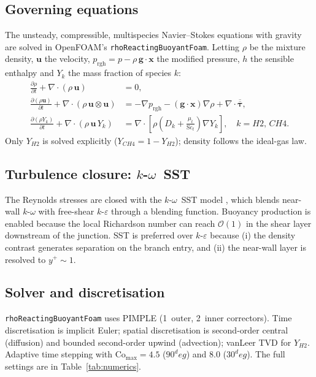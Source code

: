 \documentclass[10pt,a4paper]{article}
\def\Hi{H2}%
\def\CHi{CH4}%
\def\circ{ deg}%
\newcommand{\Hi}{\ensuremath{\mathrm{H_2}}}
\newcommand{\CHi}{\ensuremath{\mathrm{CH_4}}}
\begin{document}
\subsection{Governing equations}
\label{sec:method_govern}
The unsteady, compressible, multispecies Navier--Stokes equations
with gravity are solved in OpenFOAM's \texttt{rhoReactingBuoyantFoam}.
Letting \(\rho\) be the mixture density, \(\mathbf{u}\) the velocity,
\(p_{\mathrm{rgh}} = p - \rho\,\mathbf{g}\!\cdot\!\mathbf{x}\) the
modified pressure, \(h\) the sensible enthalpy and \(Y_k\) the mass
fraction of species \(k\):
\begin{align}
\frac{\partial\rho}{\partial t} +
\nabla\!\cdot\!(\rho\,\mathbf{u}) &= 0,
\label{eq:cont}\\[2pt]
\frac{\partial(\rho\mathbf{u})}{\partial t} +
\nabla\!\cdot\!(\rho\,\mathbf{u}\!\otimes\!\mathbf{u})
&= -\nabla p_{\mathrm{rgh}}
- (\mathbf{g}\!\cdot\!\mathbf{x})\nabla\rho
+\nabla\!\cdot\!\overline{\overline{\boldsymbol{\tau}}},
\label{eq:mom}\\[2pt]
\frac{\partial(\rho Y_k)}{\partial t} +
\nabla\!\cdot\!(\rho\,\mathbf{u}\,Y_k)
&=\nabla\!\cdot\!\left[\rho\!\left(D_k+\frac{\mu_t}{\mathrm{Sc}_t}\right)
\nabla Y_k\right],\quad k = \Hi,\,\CHi.
\label{eq:species}
\end{align}
Only \(Y_{\Hi}\) is solved explicitly (\(Y_{\CHi}=1-Y_{\Hi}\));
density follows the ideal-gas law.

\subsection{Turbulence closure: \texorpdfstring{$k$-$\omega$~SST}{k-omega SST}}
\label{sec:method_turb}
The Reynolds stresses are closed with the \(k\)-\(\omega\)~SST model
\citep{menter1994sst}, which blends near-wall \(k\)-\(\omega\) with
free-shear \(k\)-\(\varepsilon\) through a blending function.
Buoyancy production is enabled because the local Richardson number
can reach \(\mathcal{O}(1)\) in the shear layer downstream of the
junction.  SST is preferred over \(k\)-\(\varepsilon\)
\citep{su2022prediction} because (i) the density contrast generates
separation on the branch entry, and (ii) the near-wall layer is
resolved to \(y^+\sim 1\).

\subsection{Solver and discretisation}
\label{sec:method_solver}
\texttt{rhoReactingBuoyantFoam} uses PIMPLE (1~outer, 2~inner
correctors).  Time discretisation is implicit Euler; spatial
discretisation is second-order central (diffusion) and bounded
second-order upwind (advection); vanLeer TVD for \(Y_{\Hi}\).
Adaptive time stepping with \(\mathrm{Co}_{\max}=4.5\) (\(90^\circ\))
and \(8.0\) (\(30^\circ\)).
The full settings are in Table~\ref{tab:numerics}.
\end{document}
